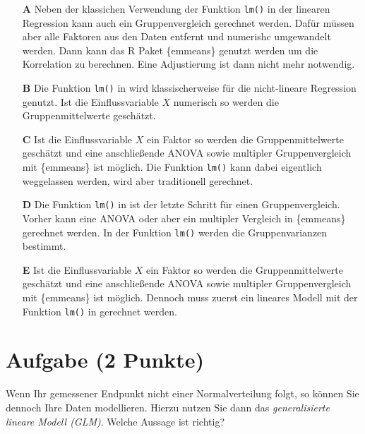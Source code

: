 \documentclass[a4paper, 9pt]{scrartcl}\usepackage[]{graphicx}\usepackage[]{xcolor}
\begin{document}
\begin{enumerate}
\item [\textbf{A} \msquare] Neben der klassichen Verwendung der Funktion \texttt{lm()} in der linearen Regression kann auch ein Gruppenvergleich gerechnet werden. Dafür müssen aber alle Faktoren aus den Daten entfernt und numerishc umgewandelt werden. Dann kann das R Paket \{emmeans\} genutzt werden um die Korrelation zu berechnen. Eine Adjustierung ist dann nicht mehr notwendig.
\item [\textbf{B} \msquare] Die Funktion \texttt{lm()} in \Rlogo wird klassischerweise für die nicht-lineare Regression genutzt. Ist die Einflussvariable $X$ numerisch so werden die Gruppenmittelwerte geschätzt.
\item [\textbf{C} \msquare] Ist die Einflussvariable $X$ ein Faktor so werden die Gruppenmittelwerte geschätzt und eine anschließende ANOVA sowie multipler Gruppenvergleich mit \{emmeans\} ist möglich. Die Funktion \texttt{lm()} kann dabei eigentlich weggelassen werden, wird aber traditionell gerechnet.
\item [\textbf{D} \msquare] Die Funktion \texttt{lm()} in \Rlogo ist der letzte Schritt für einen Gruppenvergleich. Vorher kann eine ANOVA oder aber ein multipler Vergleich in \{emmeans\} gerechnet werden. In der Funktion  \texttt{lm()} werden die Gruppenvarianzen bestimmt.
\item [\textbf{E} \msquare] Ist die Einflussvariable $X$ ein Faktor so werden die Gruppenmittelwerte geschätzt und eine anschließende ANOVA sowie multipler Gruppenvergleich mit \{emmeans\} ist möglich. Dennoch muss zuerst ein lineares Modell mit der Funktion \texttt{lm()} in \Rlogo gerechnet werden.
\end{enumerate}

\section{Aufgabe \hfill (2 Punkte)}



Wenn Ihr gemessener Endpunkt nicht einer Normalverteilung folgt, so können Sie dennoch Ihre Daten modellieren. Hierzu nutzen Sie dann das \textit{generalisierte lineare Modell (GLM)}. Welche Aussage ist richtig?
\end{document}
